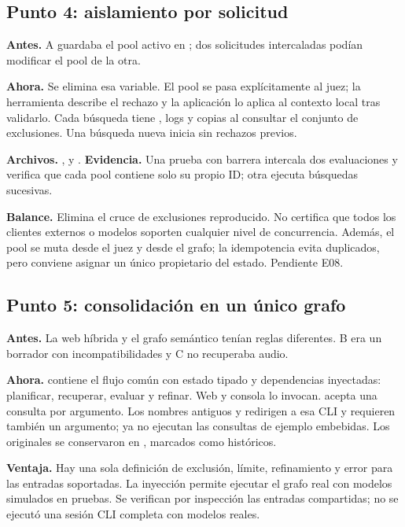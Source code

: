 \subsection{Punto 4: aislamiento por solicitud}
\label{cambio:4}
\textbf{Antes.} A guardaba el pool activo en ; dos solicitudes
intercaladas podían modificar el pool de la otra.

\textbf{Ahora.} Se elimina esa variable. El pool se pasa explícitamente al juez;
la herramienta describe el rechazo y la aplicación lo aplica al contexto local
tras validarlo. Cada búsqueda tiene , logs y copias al consultar
el conjunto de exclusiones. Una búsqueda nueva inicia sin rechazos previos.

\textbf{Archivos.} ,  y .
\textbf{Evidencia.} Una prueba con barrera intercala dos evaluaciones y verifica
que cada pool contiene solo su propio ID; otra ejecuta búsquedas sucesivas.

\textbf{Balance.} Elimina el cruce de exclusiones reproducido. No certifica que
todos los clientes externos o modelos soporten cualquier nivel de concurrencia.
Además, el pool se muta desde el juez y desde el grafo; la idempotencia evita
duplicados, pero conviene asignar un único propietario del estado. Pendiente E08.

\subsection{Punto 5: consolidación en un único grafo}
\label{cambio:5}
\textbf{Antes.} La web híbrida y el grafo semántico tenían reglas diferentes.
B era un borrador con incompatibilidades y C no recuperaba audio.

\textbf{Ahora.}  contiene el flujo común con estado tipado y
dependencias inyectadas: planificar, recuperar, evaluar y refinar. Web y consola
lo invocan.  acepta una consulta por argumento. Los nombres antiguos
 y  redirigen a esa CLI y requieren
también un argumento; ya no ejecutan las consultas de ejemplo embebidas.
Los originales se conservaron en , marcados como históricos.

\textbf{Ventaja.} Hay una sola definición de exclusión, límite, refinamiento y
error para las entradas soportadas. La inyección permite ejecutar el grafo real
con modelos simulados en pruebas. Se verifican por inspección las entradas
compartidas; no se ejecutó una sesión CLI completa con modelos reales.


